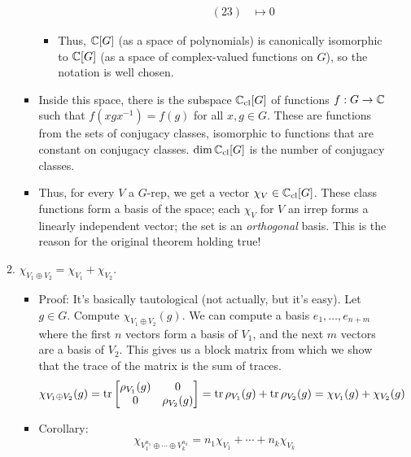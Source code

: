 \documentclass[../notes.tex]{subfiles}
\begin{document}
\begin{itemize}
\begin{enumerate}
\begin{itemize}
\begin{itemize}
\begin{itemize}
\begin{align*}
                        &&
                            (23) &\mapsto 0
                    \end{align*}
                \end{itemize}
                \item Thus, $\mathbb{C}[G]$ (as a space of polynomials) is canonically isomorphic to $\mathbb{C}[G]$ (as a space of complex-valued functions on $G$), so the notation is well chosen.
            \end{itemize}
            \item Inside this space, there is the subspace $\mathbb{C}_\text{cl}[G]$ of functions $f:G\to\mathbb{C}$ such that $f(xgx^{-1})=f(g)$ for all $x,g\in G$. These are functions from the sets of conjugacy classes, isomorphic to functions that are constant on conjugacy classes. $\dim\mathbb{C}_\text{cl}[G]$ is the number of conjugacy classes.
            \item Thus, for every $V$ a $G$-rep, we get a vector $\chi_V\in\mathbb{C}_\text{cl}[G]$. These class functions form a basis of the space; each $\chi_V$ for $V$ an irrep forms a linearly independent vector; the set is an \emph{orthogonal} basis. This is the reason for the original theorem holding true!
        \end{itemize}
        \item $\chi_{V_1\oplus V_2}=\chi_{V_1}+\chi_{V_2}$.
        \begin{itemize}
            \item Proof: It's basically tautological (not actually, but it's easy). Let $g\in G$. Compute $\chi_{V_1\oplus V_2}(g)$. We can compute a basis $e_1,\dots,e_{n+m}$ where the first $n$ vectors form a basis of $V_1$, and the next $m$ vectors are a basis of $V_2$. This gives us a block matrix from which we show that the trace of the matrix is the sum of traces.
            \begin{equation*}
                \chi_{V_1\oplus V_2}(g) = \tr
                \begin{bmatrix}
                    \rho_{V_1}(g) & 0\\
                    0 & \rho_{V_2}(g)\\
                \end{bmatrix}
                = \tr\rho_{V_1}(g)+\tr\rho_{V_2}(g)
                = \chi_{V_1}(g)+\chi_{V_2}(g)
            \end{equation*}
            \item Corollary:
            \begin{equation*}
                \chi_{V_1^{n_1}\oplus\cdots\oplus V_k^{n_k}} = n_1\chi_{V_1}+\cdots+n_k\chi_{V_k}

\end{equation*}
\end{itemize}
\end{enumerate}
\end{itemize}
\end{document}
